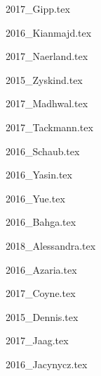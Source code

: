 {2017_Gipp.tex}

{2016_Kianmajd.tex}

{2017_Naerland.tex}

{2015_Zyskind.tex}

{2017_Madhwal.tex}

{2017_Tackmann.tex}

{2016_Schaub.tex}

{2016_Yasin.tex}

{2016_Yue.tex}

{2016_Bahga.tex}

{2018_Alessandra.tex}

{2016_Azaria.tex}

{2017_Coyne.tex}

{2015_Dennis.tex}

{2017_Jaag.tex}

{2016_Jacynycz.tex}

